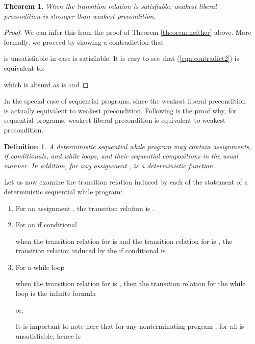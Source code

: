 \documentclass[times]{elsarticle}
\newtheorem{theorem}{Theorem}
\newtheorem{definition}{Definition}
\begin{document}
\begin{theorem} \label{theorem:wlpstronger}
  When the transition relation is satisfiable, weakest liberal 
  precondition is stronger than weakest precondition. 
\end{theorem}

\begin{proof}
We can infer this from the proof of Theorem \ref{theorem:neither}
above. More formally, we proceed by showing a contradiction that

is unsatisfiable in case  is satisfiable.
It is easy to see that (\ref{eqn:contradict2}) is equivalent to:

which is absurd as  is  and

\end{proof}

In the special case of sequential programs, since the weakest liberal
precondition is actually equivalent to weakest precondition. Following
is the proof why, for sequential programs, weakest liberal
precondition is equivalent to weakest precondition.

\begin{definition}
  A deterministic sequential while program may contain assignments, if
  conditionals, and while loops, and their sequential compositions in
  the usual manner. In addition, for any assignment , 
  is a deterministic function.
\end{definition}

Let us now examine the transition relation induced by each of the
statement of a deterministic sequential while program:
\begin{enumerate}
\item For an assignment , the transition relation  is .
\item For an if conditional

when the transition relation for  is  and the
transition relation for  is , the transition relation
 induced by the if conditional is

\item For a while loop

when the transition relation for  is , then the
transition relation for the while loop is the infinite formula

or,

It is important to note here that for any nonterminating program ,  for all  is unsatisfiable, hence  is 
\end{enumerate}
\end{document}

